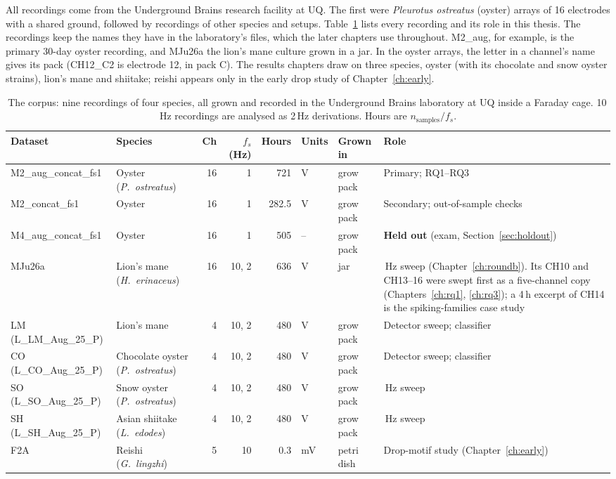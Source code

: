 All recordings come from the Underground Brains research facility at UQ. The first were \emph{Pleurotus ostreatus} (oyster) arrays of 16 electrodes with a shared ground, followed by recordings of other species and setups. Table~\ref{tab:corpus} lists every recording and its role in this thesis. The recordings keep the names they have in the laboratory's files, which the later chapters use throughout. M2\_aug, for example, is the primary 30-day oyster recording, and MJu26a the lion's mane culture grown in a jar. In the oyster arrays, the letter in a channel's name gives its pack (CH12\_C2 is electrode 12, in pack C). The results chapters draw on three species, oyster (with its chocolate and snow oyster strains), lion's mane and shiitake; reishi appears only in the early drop study of Chapter~\ref{ch:early}.

\begin{table}[htbp]
\caption[{The corpus: nine recordings of four species.}]{The corpus: nine recordings of four species, all grown and recorded in the Underground Brains laboratory at UQ inside a Faraday cage. 10\,Hz recordings are analysed as 2\,Hz derivations. Hours are $n_\text{samples}/f_s$.}
\label{tab:corpus}
\footnotesize
\setlength{\tabcolsep}{4pt}
\begin{tabularx}{\textwidth}{>{\raggedright\arraybackslash}p{3.25cm} >{\raggedright\arraybackslash}p{2.3cm} r r r l l >{\raggedright\arraybackslash}X}
\toprule
\textbf{Dataset} & \textbf{Species} & \textbf{Ch} & \textbf{$f_s$ (Hz)} & \textbf{Hours} & \textbf{Units} & \textbf{Grown in} & \textbf{Role}\\
\midrule
M2\_aug\_concat\_fs1 & Oyster (\emph{P.~ostreatus}) & 16 & 1 & 721 & V & grow pack & Primary; RQ1--RQ3\\
M2\_concat\_fs1 & Oyster & 16 & 1 & 282.5 & V & grow pack & Secondary; out-of-sample checks\\
M4\_aug\_concat\_fs1 & Oyster & 16 & 1 & 505 & -- & grow pack & \textbf{Held out} (exam, Section~\ref{sec:holdout})\\
MJu26a & Lion's mane (\emph{H.~erinaceus}) & 16 & 10, 2 & 636 & V & jar & 2\,Hz sweep (Chapter~\ref{ch:roundb}). Its CH10 and CH13--16 were swept first as a five-channel copy (Chapters~\ref{ch:rq1}, \ref{ch:rq3}); a 4\,h excerpt of CH14 is the spiking-families case study\\
LM (L\_LM\_Aug\_25\_P) & Lion's mane & 4 & 10, 2 & 480 & V & grow pack & Detector sweep; classifier\\
CO (L\_CO\_Aug\_25\_P) & Chocolate oyster (\emph{P.~ostreatus}) & 4 & 10, 2 & 480 & V & grow pack & Detector sweep; classifier\\
SO (L\_SO\_Aug\_25\_P) & Snow oyster (\emph{P.~ostreatus}) & 4 & 10, 2 & 480 & V & grow pack & 2\,Hz sweep\\
SH (L\_SH\_Aug\_25\_P) & Asian shiitake (\emph{L.~edodes}) & 4 & 10, 2 & 480 & V & grow pack & 2\,Hz sweep\\
F2A & Reishi (\emph{G.~lingzhi}) & 5 & 10 & 0.3 & mV & petri dish & Drop-motif study (Chapter~\ref{ch:early})\\
\bottomrule
\end{tabularx}
\end{table}

